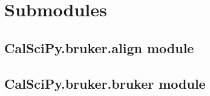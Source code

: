 \documentclass[letterpaper,10pt,english]{sphinxmanual}
\begin{document}
\section{Submodules}
\label{\detokenize{CalSciPy.bruker:submodules}}
\sphinxstepscope


\subsection{CalSciPy.bruker.align module}
\label{\detokenize{CalSciPy.bruker.align:module-CalSciPy.bruker.align}}\label{\detokenize{CalSciPy.bruker.align:calscipy-bruker-align-module}}\label{\detokenize{CalSciPy.bruker.align::doc}}
\sphinxstepscope


\subsection{CalSciPy.bruker.bruker module}
\label{\detokenize{CalSciPy.bruker.bruker:module-CalSciPy.bruker.bruker}}\label{\detokenize{CalSciPy.bruker.bruker:calscipy-bruker-bruker-module}}\label{\detokenize{CalSciPy.bruker.bruker::doc}}
\end{document}
